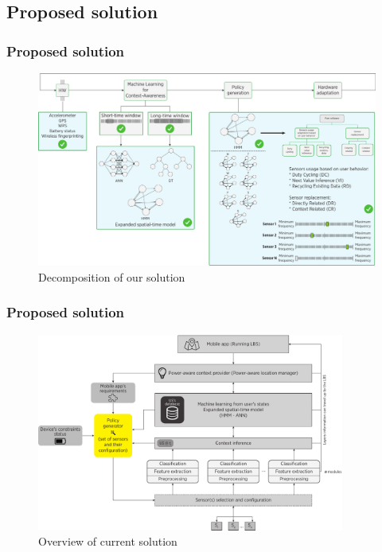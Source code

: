 \documentclass[compress,9pt,xcolor={dvipsnames,table}]{beamer}
\begin{document}
\subsection{Proposed solution}
\begin{frame}[t]\frametitle{Proposed solution}
\begin{figure}[tb]
  \centering
  \includegraphics[width=\textwidth]{../../../resources/images/vectors/dual-taxonomy-ours}
  \caption{Decomposition of our solution}
  \label{fig:dual-taxonomy-ours}
  \end{figure}
\end{frame}

\begin{frame}[t]\frametitle{Proposed solution}
\begin{figure}[tb]
  \centering
  \includegraphics[width=0.9\textwidth]{../../../resources/images/vectors/solution-general-overview}
  \caption{Overview of current solution}
  \label{fig:solution}
\end{figure}
\end{frame}
\end{document}
